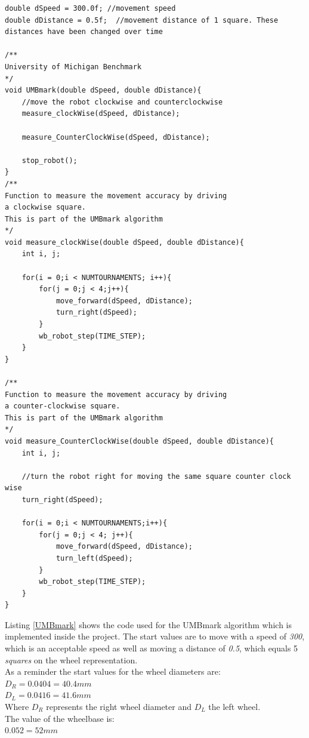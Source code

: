 \begin{lstlisting}[caption={The UMBmark experiment procedure}, label={UMBmark}]
double dSpeed = 300.0f; //movement speed
double dDistance = 0.5f;  //movement distance of 1 square. These distances have been changed over time

/**
University of Michigan Benchmark
*/
void UMBmark(double dSpeed, double dDistance){    
    //move the robot clockwise and counterclockwise
    measure_clockWise(dSpeed, dDistance);
    
    measure_CounterClockWise(dSpeed, dDistance);
    
    stop_robot();
}
/**
Function to measure the movement accuracy by driving
a clockwise square.
This is part of the UMBmark algorithm
*/
void measure_clockWise(double dSpeed, double dDistance){
    int i, j;
    
    for(i = 0;i < NUMTOURNAMENTS; i++){
        for(j = 0;j < 4;j++){
            move_forward(dSpeed, dDistance);
            turn_right(dSpeed);
        }
        wb_robot_step(TIME_STEP);
    }
} 

/**
Function to measure the movement accuracy by driving
a counter-clockwise square.
This is part of the UMBmark algorithm
*/
void measure_CounterClockWise(double dSpeed, double dDistance){
    int i, j;
    
    //turn the robot right for moving the same square counter clock wise
    turn_right(dSpeed);
    
    for(i = 0;i < NUMTOURNAMENTS;i++){        
        for(j = 0;j < 4; j++){
            move_forward(dSpeed, dDistance);
            turn_left(dSpeed);
        }
        wb_robot_step(TIME_STEP);
    }
}
\end{lstlisting}

Listing \ref{UMBmark} shows the code used for the UMBmark algorithm which is implemented inside the project. The start values are to move with a speed of \textit{300}, which is an acceptable speed as well as moving a distance of \textit{0.5}, which equals 5 \textit{squares} on the wheel representation.\\
As a reminder the start values for the wheel diameters are:\\
$D_{R} = 0.0404 = 40.4mm$\\
$D_{L} = 0.0416 = 41.6mm$\\
Where $D_{R}$ represents the right wheel diameter and  $D_{L}$ the left wheel.\\
The value of the wheelbase is:\\
$0.052 = 52mm$\\

